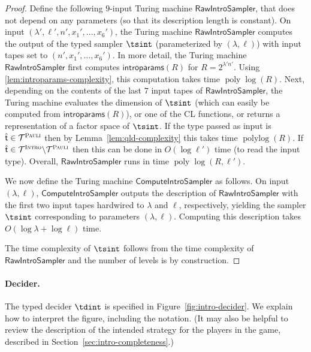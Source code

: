 \documentclass[11pt]{article}
\theoremstyle{definition}
\DeclareMathOperator{\poly}{poly}
\DeclareMathOperator{\polylog}{polylog}
\newcommand{\type}{\mathcal{T}}
\newcommand{\gamestyle}[1]{\ensuremath{\textsc{#1}}\xspace}
\newcommand{\pauli}{\gamestyle{Pauli}}
\newcommand{\intro}{\gamestyle{Intro}}
\newcommand{\tvarstyle}[1]{\mathsf{#1}}
\newcommand{\tvar}{\ensuremath{\tvarstyle{t}}}
\newcommand{\introparams}{\mathsf{introparams}}
\newcommand{\tmstyle}[1]{\ensuremath{\mathsf{#1}}}
\newcommand{\RawIntroSampler}{\tmstyle{RawIntroSampler}}
\newcommand{\ComputeIntroSampler}{\tmstyle{ComputeIntroSampler}}
\begin{document}
\begin{proof}
  Define the following $9$-input Turing machine
  $\RawIntroSampler$, that does not depend on any parameters (so that its description length is constant). 
  On input $(\lambda', \ell', n', x_1', \ldots, x_6')$, the Turing machine $\RawIntroSampler$
  computes the output of the typed sampler $\tsint$ (parameterized by
  $(\lambda, \ell)$) with input tapes set to $(n', x_1', \ldots, x_6')$.
  In more detail, the Turing machine $\RawIntroSampler$ first computes
  $\introparams(R)$ for $R= 2^{\lambda' n'}$.
  Using \cref{lem:introparams-complexity}, this computation takes time
  $\poly\log(R)$.
  Next, depending on the contents of the last $7$ input tapes of
  $\RawIntroSampler$, the Turing machine evaluates the dimension of
  $\tsint$ (which can easily be computed from $\introparams(R)$), or
  one of the CL functions, or returns a representation of a factor space of
  $\tsint$.
  If the type passed as input is $\hat{\tvar} \in \type^\pauli$ then by
  Lemma~\ref{lem:qld-complexity} this takes time $\polylog(R)$.
  If $\hat{\tvar} \in \type^\intro\backslash\type^\pauli$ then this can be done
  in $O(\log \ell')$ time (to read the input type).
  Overall, $\RawIntroSampler$ runs in time $\poly\log(R,\ell')$.
  
  We now define the Turing machine $\ComputeIntroSampler$ as follows.
  On input $(\lambda,\ell)$, $\ComputeIntroSampler$ outputs the description of
  $\RawIntroSampler$ with the first two input tapes hardwired to $\lambda$ and
  $\ell$, respectively, yielding the sampler $\tsint$ corresponding to
  parameters $(\lambda,\ell)$.
  Computing this description takes $O(\log \lambda + \log \ell)$ time.
  
  The time complexity of $\tsint$ follows from the time complexity of
  $\RawIntroSampler$ and the number of levels is by construction.
\end{proof}

\paragraph{Decider.}
The typed decider $\tdint$ is specified in
Figure~\ref{fig:intro-decider}.
We explain how to interpret the figure, including the notation.
(It may also be helpful to review the description of the intended strategy for
the players in the game, described in Section~\ref{sec:intro-completeness}.)
\end{document}
